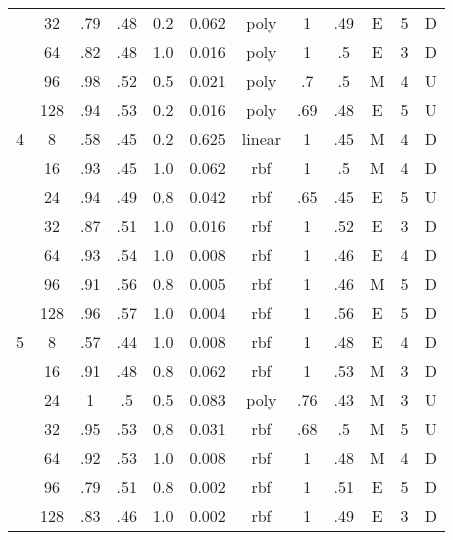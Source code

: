 \begin{table}
\begin{tabular}{|c|c|ccccc||ccccc|}
  &  32 &   .79 &  .48 & 0.2 &    0.062 &   poly &     1 &  .49 &      E & 5 &       D \\
  &  64 &   .82 &  .48 & 1.0 &    0.016 &   poly &     1 &   .5 &      E & 3 &       D \\
  &  96 &   .98 &  .52 & 0.5 &    0.021 &   poly &    .7 &   .5 &      M & 4 &       U \\
  & 128 &   .94 &  .53 & 0.2 &    0.016 &   poly &   .69 &  .48 &      E & 5 &       U \\\hline
4 &   8 &   .58 &  .45 & 0.2 &    0.625 & linear &     1 &  .45 &      M & 4 &       D \\
  &  16 &   .93 &  .45 & 1.0 &    0.062 &    rbf &     1 &   .5 &      M & 4 &       D \\
  &  24 &   .94 &  .49 & 0.8 &    0.042 &    rbf &   .65 &  .45 &      E & 5 &       U \\
  &  32 &   .87 &  .51 & 1.0 &    0.016 &    rbf &     1 &  .52 &      E & 3 &       D \\
  &  64 &   .93 &  .54 & 1.0 &    0.008 &    rbf &     1 &  .46 &      E & 4 &       D \\
  &  96 &   .91 &  .56 & 0.8 &    0.005 &    rbf &     1 &  .46 &      M & 5 &       D \\
  & 128 &   .96 &  .57 & 1.0 &    0.004 &    rbf &     1 &  .56 &      E & 5 &       D \\\hline
5 &   8 &   .57 &  .44 & 1.0 &    0.008 &    rbf &     1 &  .48 &      E & 4 &       D \\
  &  16 &   .91 &  .48 & 0.8 &    0.062 &    rbf &     1 &  .53 &      M & 3 &       D \\
  &  24 &     1 &   .5 & 0.5 &    0.083 &   poly &   .76 &  .43 &      M & 3 &       U \\
  &  32 &   .95 &  .53 & 0.8 &    0.031 &    rbf &   .68 &   .5 &      M & 5 &       U \\
  &  64 &   .92 &  .53 & 1.0 &    0.008 &    rbf &     1 &  .48 &      M & 4 &       D \\
  &  96 &   .79 &  .51 & 0.8 &    0.002 &    rbf &     1 &  .51 &      E & 5 &       D \\
  & 128 &   .83 &  .46 & 1.0 &    0.002 &    rbf &     1 &  .49 &      E & 3 &       D \\\hline
\end{tabular}
\end{table}
